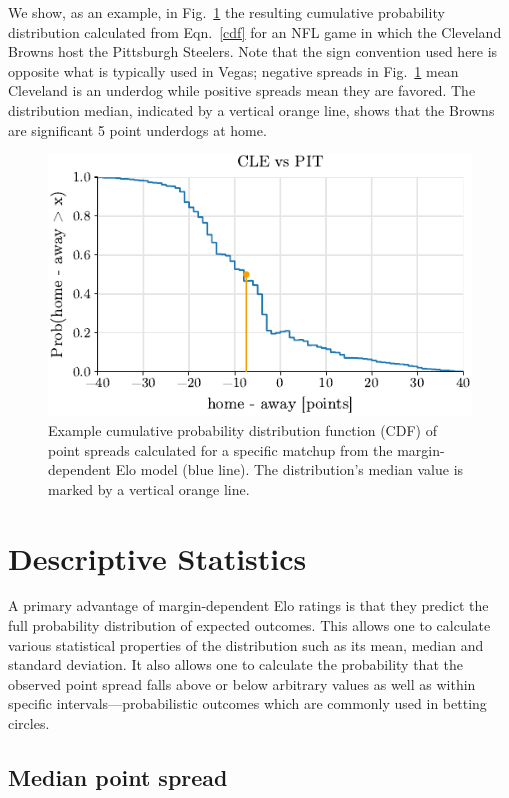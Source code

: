 \documentclass[aps,prc,reprint,amsmath,superscriptaddress]{revtex4-1}
\begin{document}
We show, as an example, in Fig.~\ref{fig:example} the resulting cumulative probability distribution calculated from Eqn.~\eqref{cdf} for an NFL game in which the Cleveland Browns host the Pittsburgh Steelers. 
Note that the sign convention used here is opposite what is typically used in Vegas; negative spreads in Fig.~\ref{fig:example} mean Cleveland is an underdog while positive spreads mean they are favored.
The distribution median, indicated by a vertical orange line, shows that the Browns are significant 5 point underdogs at home.

\begin{figure}
  \includegraphics{example_distribution}
  \caption{\label{fig:example} Example cumulative probability distribution function (CDF) of point spreads calculated for a specific matchup from the margin-dependent Elo model (blue line). The distribution's median value is marked by a vertical orange line.}
\end{figure}

\section{Descriptive Statistics}

A primary advantage of margin-dependent Elo ratings is that they predict the full probability distribution of expected outcomes.
This allows one to calculate various statistical properties of the distribution such as its mean, median and standard deviation.
It also allows one to calculate the probability that the observed point spread falls above or below arbitrary values as well as within specific intervals---probabilistic outcomes which are commonly used in betting circles.

\subsection{Median point spread}
\end{document}
